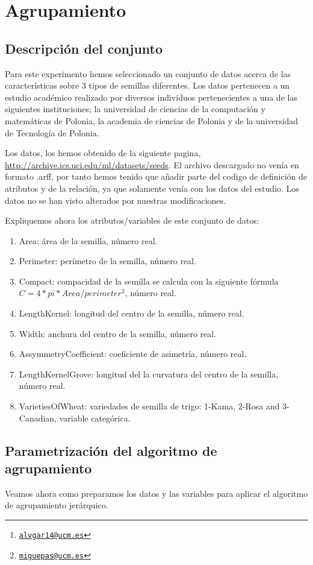\documentclass[a4paper, 11pt, twoside, openany, onecolumn, final]{memoir}
\title{\tb{Inteligencia artificial: Práctica $8$}}
\author{Álvaro García Tenorio \thanks{\texttt{\url{alvgar14@ucm.es}}}\and Miguel Pascual Domínguez\thanks{\texttt{\url{miguepas@ucm.es}}}}
\date{\today}
\begin{document}
	\maketitle
	\tableofcontents
	\chapter{Agrupamiento}
	\section{Descripción del conjunto}
	Para este experimento hemos seleccionado un conjunto de datos acerca de las características sobre 3 tipos de semillas diferentes. Los datos pertenecen a un estudio académico realizado por diversos individuos pertenecientes a una de las siguientes instituciones; la universidad de ciencias de la computación y matemáticas de Polonia, la academia de ciencias de Polonia y de la universidad de Tecnología de Polonia.
	
	Los datos, los hemos obtenido de la siguiente pagina, \url{http://archive.ics.uci.edu/ml/datasets/seeds}. El archivo descargado no venía en formato .arff, por tanto hemos tenido que añadir parte del codigo de definición de atributos y de la relación, ya que solamente venía con los datos del estudio. Los datos no se han visto alterados por nuestras modificaciones.
	
	Expliquemos ahora los atributos/variables de este conjunto de datos:
	
	\begin{enumerate}
\item Area: área de la semilla, número real.
\item Perimeter: perímetro de la semilla, número real.
\item Compact: compacidad de la semilla se calcula con la siguiente fórmula $C=4*pi*Area/perimeter^2$, número real.
\item LengthKernel: longitud del centro de la semilla, número real.
\item Width: anchura del centro de la semilla, número real.
\item AssymmetryCoefficient: coeficiente de asimetría, número real. 
\item LengthKernelGrove: longitud del la curvatura del centro de la semilla, número real.
\item VarietiesOfWheat: variedades de semilla de trigo: 1-Kama, 2-Rosa and 3-Canadian, variable categórica.
\end{enumerate}
	\section{Parametrización del algoritmo de agrupamiento}
	Veamos ahora como preparamos los datos y las variables para aplicar el algoritmo de agrupamiento jerárquico.
	
\end{document}
